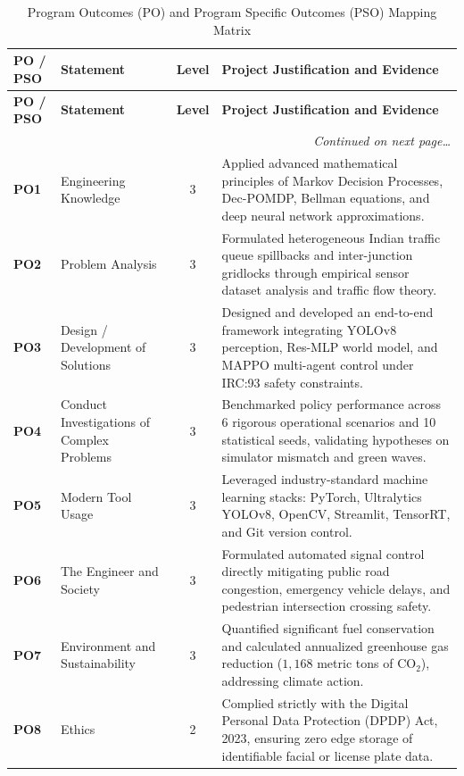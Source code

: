 \begin{small}
\begin{longtable}{|p{1.8cm}|p{2.8cm}|c|p{8.2cm}|}
\caption{Program Outcomes (PO) and Program Specific Outcomes (PSO) Mapping Matrix} \label{tab:po_pso_mapping} \\
\hline
\textbf{PO / PSO} & \textbf{Statement} & \textbf{Level} & \textbf{Project Justification and Evidence} \\ \hline
\endfirsthead
\hline
\textbf{PO / PSO} & \textbf{Statement} & \textbf{Level} & \textbf{Project Justification and Evidence} \\ \hline
\endhead
\hline
\multicolumn{4}{|r|}{\textit{Continued on next page\dots}} \\ \hline
\endfoot
\hline
\endlastfoot

\textbf{PO1} & Engineering Knowledge & 3 & Applied advanced mathematical principles of Markov Decision Processes, Dec-POMDP, Bellman equations, and deep neural network approximations. \\ \hline
\textbf{PO2} & Problem Analysis & 3 & Formulated heterogeneous Indian traffic queue spillbacks and inter-junction gridlocks through empirical sensor dataset analysis and traffic flow theory. \\ \hline
\textbf{PO3} & Design / Development of Solutions & 3 & Designed and developed an end-to-end framework integrating YOLOv8 perception, Res-MLP world model, and MAPPO multi-agent control under IRC:93 safety constraints. \\ \hline
\textbf{PO4} & Conduct Investigations of Complex Problems & 3 & Benchmarked policy performance across 6 rigorous operational scenarios and 10 statistical seeds, validating hypotheses on simulator mismatch and green waves. \\ \hline
\textbf{PO5} & Modern Tool Usage & 3 & Leveraged industry-standard machine learning stacks: PyTorch, Ultralytics YOLOv8, OpenCV, Streamlit, TensorRT, and Git version control. \\ \hline
\textbf{PO6} & The Engineer and Society & 3 & Formulated automated signal control directly mitigating public road congestion, emergency vehicle delays, and pedestrian intersection crossing safety. \\ \hline
\textbf{PO7} & Environment and Sustainability & 3 & Quantified significant fuel conservation and calculated annualized greenhouse gas reduction ($1,168$ metric tons of $\text{CO}_2$), addressing climate action. \\ \hline
\textbf{PO8} & Ethics & 2 & Complied strictly with the Digital Personal Data Protection (DPDP) Act, 2023, ensuring zero edge storage of identifiable facial or license plate data. \\ \hline

\end{longtable}
\end{small}
